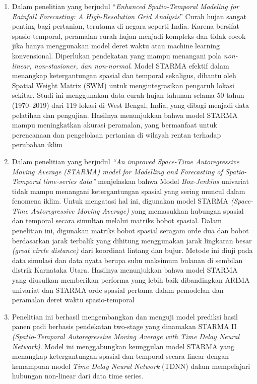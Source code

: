 \begin{enumerate}
    \item Dalam penelitian yang berjudul “\textit{Enhanced Spatio-Temporal Modeling for Rainfall Forecasting: A High-Resolution Grid Analysis}” Curah hujan sangat penting bagi pertanian, terutama di negara seperti India. Karena bersifat spasio-temporal, peramalan curah hujan menjadi kompleks dan tidak cocok jika hanya menggunakan model deret waktu atau machine learning konvensional. Diperlukan pendekatan yang mampu menangani pola \textit{non-linear, non-stasioner, dan non-normal}. Model STARMA efektif dalam menangkap ketergantungan spasial dan temporal sekaligus, dibantu oleh Spatial Weight Matrix (SWM) untuk mengintegrasikan pengaruh lokasi sekitar. Studi ini menggunakan data curah hujan tahunan selama 50 tahun (1970–2019) dari 119 lokasi di West Bengal, India, yang dibagi menjadi data pelatihan dan pengujian. Hasilnya menunjukkan bahwa model STARMA mampu meningkatkan akurasi peramalan, yang bermanfaat untuk perencanaan dan pengelolaan pertanian di wilayah rentan terhadap perubahan iklim \citep{alam2024enhanced}
    \item Dalam penelitian yang berjudul\textit{ “An improved Space-Time Autoregressive Moving Average (STARMA) model for Modelling and Forecasting of Spatio-Temporal time-series data”} menjelaskan bahwa Model\textit{ Box-Jenkins } univariat tidak mampu menangani ketergantungan spasial yang sering muncul dalam fenomena iklim. Untuk mengatasi hal ini, digunakan model STARMA\textit{ (Space-Time Autoregressive Moving Average)} yang memasukkan hubungan spasial dan temporal secara simultan melalui matriks bobot spasial. Dalam penelitian ini, digunakan matriks bobot spasial seragam orde dua dan bobot berdasarkan jarak terbalik yang dihitung menggunakan jarak lingkaran besar \textit{(great circle distance)} dari koordinat lintang dan bujur. Metode ini diuji pada data simulasi dan data nyata berupa suhu maksimum bulanan di sembilan distrik Karnataka Utara. Hasilnya menunjukkan bahwa model STARMA yang diusulkan memberikan performa yang lebih baik dibandingkan ARIMA univariat dan STARMA orde spasial pertama dalam pemodelan dan peramalan deret waktu spasio-temporal \citep{rathod2018improved}
    \item Penelitian ini berhasil mengembangkan dan menguji model prediksi hasil panen padi berbasis pendekatan two-stage yang dinamakan STARMA II \textit{(Spatio-Temporal Autoregressive Moving Average with Time Delay Neural Network)}. Model ini menggabungkan keunggulan model STARMA yang menangkap ketergantungan spasial dan temporal secara linear dengan kemampuan model\textit{ Time Delay Neural Network } (TDNN) dalam mempelajari hubungan non-linear dari data time series. 
    

\end{enumerate}
